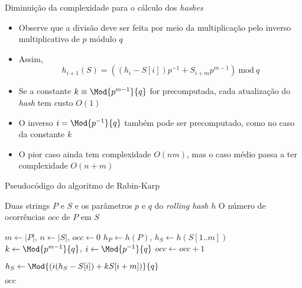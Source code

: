 \begin{frame}[fragile]{Diminuição da complexidade para o cálculo dos {\it hashes}}

    \begin{itemize}
        \item Observe que a divisão deve ser feita por meio da multiplicação pelo inverso
            multiplicativo de $p$ módulo $q$

        \item Assim,
        \[
            h_{i+1}(S) = \left((h_{i} - S[i])p^{-1} + S_{i+m}p^{m -1}\right)\ \mbox{mod}\ q
        \]

        \item Se a constante $k\equiv \Mod{p^{m-1}}{q}$ for precomputada, cada atualização do
            \textit{hash} tem custo $O(1)$

        \item O inverso $i = \Mod{p^{-1}}{q}$ também pode ser precomputado, como no caso da constante $k$

        \item O pior caso ainda tem complexidade $O(nm)$, mas o caso médio passa a ter
            complexidade $O(n + m)$

    \end{itemize}

\end{frame}

\begin{frame}[fragile]{Pseudocódigo do algoritmo de Rabin-Karp}

    \begin{algorithm}[H]
        \caption{Algoritmo de Rabin-Karp com \textit{Rolling Hash}}
        \begin{algorithmic}[1]
            \Require Duas strings $P$ e $S$ e os parâmetros $p$ e $q$ do \textit{rolling hash} $h$
            \Ensure O número de ocorrências $occ$ de $P$ em $S$

                \State $m \gets |P|$, $n \gets |S|$, $occ \gets 0$
                \State $h_P \gets h(P)$, $h_S \gets h(S[1..m])$
                \State $k \gets \Mod{p^{m - 1}}{q}$, $i \gets \Mod{p^{-1}}{q}$
                \State
                            \State $occ \gets occ + 1$
                        \EndIf
                    \EndIf

                        \State $h_S \gets \Mod{\left(i(h_S - S[i]) + kS[i + m]\right)}{q}$
                    \EndIf
                \EndFor

                \State \Return $occ$
            \EndFunction
        \end{algorithmic}
    \end{algorithm}

\end{frame}

